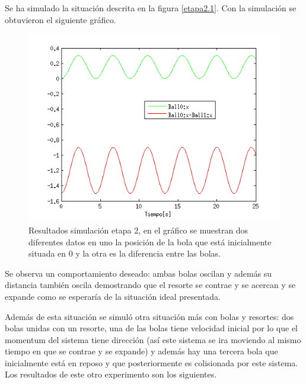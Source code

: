 \documentclass[a4paper,10pt]{article}
\begin{document}
Se ha simulado la situación descrita en la figura \ref{etapa2.1}. Con la simulación se obtuvieron el siguiente gráfico.

\begin{figure}[H]
 \centering
 \includegraphics[scale=0.5]{./simulacion_etapa2.png}
 \caption{Resultados simulación etapa 2, en el gráfico se muestran dos diferentes datos en uno la posición de la bola que está inicialmente
 situada en 0 y la otra es la diferencia entre las bolas.}
  \label{etapa1.2}
\end{figure}

  Se observa un comportamiento deseado: ambas bolas oscilan y además su distancia también oscila demostrando que el resorte se contrae y se acercan
  y se expande como se esperaría de la situación ideal presentada.\newline
  
  Además de esta situación se simuló otra situación más con bolas y resortes: dos bolas unidas con un resorte, una de las bolas tiene velocidad inicial
  por lo que el momentum del sistema tiene dirección (así este sistema se ira moviendo al mismo tiempo en que se contrae y se expande) y
  además hay una tercera bola que inicialmente está en reposo y que posteriormente es colisionada por este sistema. Los resultados de este otro
  experimento son los siguientes.
  
\end{document}
